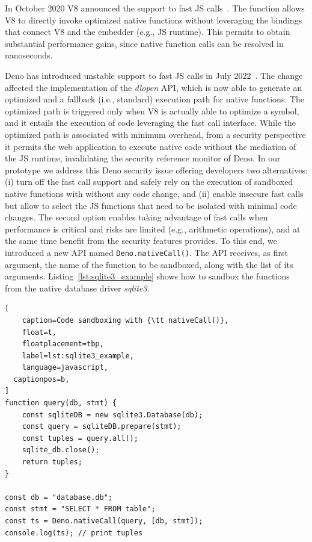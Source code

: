In October 2020 V8 announced the support to fast JS
calls~\cite{v8-fast-calls}. The function allows V8 to directly invoke optimized native
functions without leveraging the bindings that connect V8 and the
embedder (e.g., JS runtime). This permits to obtain substantial
performance gains, since native function calls can be resolved in
nanoseconds. 

Deno has introduced unstable support to fast JS calls in July
2022~\cite{deno-v1234}. The change affected the implementation of the
{\em dlopen} API, which is now able to generate an optimized and a
fallback (i.e., standard) execution path for native functions. The
optimized path is triggered only when V8 is actually able to optimize
a symbol, and it entails the execution of code leveraging the fast
call interface. While the optimized path is associated with minimum
overhead, from a security perspective it permits the web application
to execute native code without the mediation of the JS runtime,
invalidating the security reference monitor of Deno.
%
In our prototype we address this Deno security issue offering
developers two alternatives: (i) turn off
the fast call support and safely rely on the execution of sandboxed
native functions with \natisand without any code change, and (ii) enable insecure fast calls but
allow to select the JS functions that need to be isolated with minimal code changes. The second
option enables taking advantage of fast calls when performance is
critical and risks are limited (e.g., arithmetic operations), and at
the same time benefit from the security features \natisand provides. To
this end, we introduced a new API named {\tt Deno.nativeCall()}. The API receives, as first argument, the name of the function
to be sandboxed, along with the list of its arguments.
Listing~\ref{lst:sqlite3_example} shows how to sandbox the functions
from the native database driver {\em sqlite3}.
%
\begin{lstlisting}[
	caption=Code sandboxing with {\tt nativeCall()},
	float=t,
	floatplacement=tbp,
	label=lst:sqlite3_example,
	language=javascript,
  captionpos=b,
]
function query(db, stmt) {
    const sqliteDB = new sqlite3.Database(db);
    const query = sqliteDB.prepare(stmt);
    const tuples = query.all();
    sqlite_db.close();
    return tuples;
}

const db = "database.db";  
const stmt = "SELECT * FROM table";
const ts = Deno.nativeCall(query, [db, stmt]);
console.log(ts); // print tuples
\end{lstlisting}

